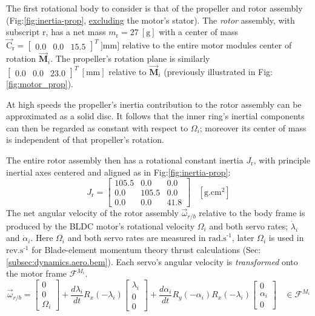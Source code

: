 \par
The first rotational body to consider is that of the propeller and rotor assembly (Fig:\ref{fig:inertia-prop}, \underline{excluding} the motor's stator). The \emph{rotor} assembly, with subscript r, has a net mass $m_{\text{r}}=27~[\text{g}]$ with a center of mass $\vec{\text{C}}_{\text{r}}=\begin{bmatrix}0.0&0.0&15.5\end{bmatrix}^T~]\text{mm}]$ relative to the entire motor modules center of rotation $\vec{\mathbf{M}}_i$. The propeller's rotation plane is similarly $\begin{bmatrix}0.0&0.0&23.0\end{bmatrix}^T~[\text{mm}]$ relative to $\vec{\mathbf{M}}_i$ (previously illustrated in Fig:\ref{fig:motor_prop}). 
\par
At high speeds the propeller's inertia contribution to the rotor assembly can be approximated as a solid disc. It follows that the inner ring's inertial components can then be regarded as constant with respect to $\Omega_i$; moreover its center of mass is independent of that propeller's rotation. 
\par
The entire rotor assembly then has a rotational constant inertia $J_\text{r}$, with principle inertial axes centered and aligned as in Fig:\ref{fig:inertia-prop}:
\begin{equation}\label{eq:prop-inertia}
J_\text{r}=\begin{bmatrix}
105.5 & 0.0 & 0.0\\
0.0 & 105.5 & 0.0\\
0.0 & 0.0 & 41.8
\end{bmatrix}~~~~[\text{g.cm}^2]
\end{equation}
The net angular velocity of the rotor assembly $\vec{\omega}_{r/b}$ relative to the body frame is produced by the BLDC motor's rotational velocity $\Omega_i$ and both servo rates; $\dot{\lambda}_i$ and $\dot{\alpha}_i$. Here $\Omega_i$ and both servo rates are measured in $\text{rad.s}^{\text{-}1}$, later $\Omega_i$ is used in $\text{rev.s}^{\text{-}1}$ for Blade-element momentum theory thrust calculations (Sec:\ref{subsec:dynamics.aero.bem}). Each servo's angular velocity is \emph{transformed} onto the motor frame $\mathcal{F}^{M_i}$.
\begin{equation}\label{eq:net-angular-rot}
\vec{\omega}_{r/b}=\begin{bmatrix}
0\\
0\\
\Omega_i
\end{bmatrix}
+\frac{d\lambda_i}{dt}R_x(-\lambda_i)\begin{bmatrix}
\lambda_i\\
0\\
0
\end{bmatrix}+\frac{d\alpha_i}{dt}R_y(-\alpha_i)R_x(-\lambda_i)\begin{bmatrix}
0\\
\alpha_i\\
0
\end{bmatrix}~~~~\in\mathcal{F}^{M_i}
\end{equation}
